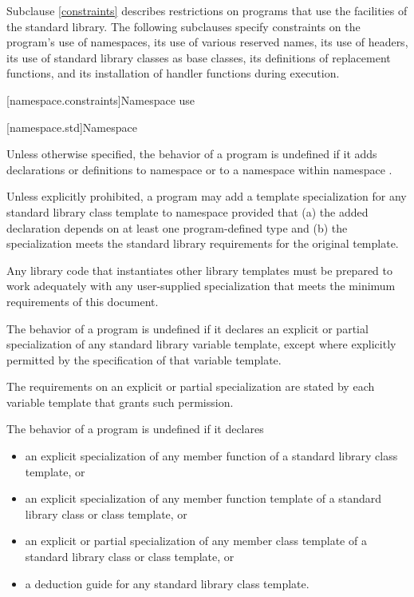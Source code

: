 \pnum
Subclause \ref{constraints} describes restrictions on \Cpp{} programs that use the facilities of
the \Cpp{} standard library. The following subclauses specify constraints on the
program's use of namespaces, its use of various reserved
names, its use of headers, its use of
standard library classes as base classes, its
definitions of replacement functions, and its
installation of handler functions during execution.

[namespace.constraints]{Namespace use}

[namespace.std]{Namespace }

\pnum
Unless otherwise specified,
the behavior of a \Cpp{} program is undefined if it adds declarations or definitions to namespace
or to a namespace within namespace
.

\pnum
Unless explicitly prohibited,
a program may add a template specialization for
any standard library class template
to namespace
 provided that
(a) the added declaration
depends on at least one program-defined type
and
(b) the specialization meets the standard library requirements
for the original template.
\begin{footnote}
Any
library code that instantiates other library templates
must be prepared to work adequately with any user-supplied specialization
that meets the minimum requirements of this document.
\end{footnote}

\pnum
The behavior of a \Cpp{} program is undefined
if it declares an explicit or partial specialization
of any standard library variable template,
except where explicitly permitted by the specification of that variable template.
\begin{note}
The requirements on an explicit or partial specialization
are stated by each variable template that grants such permission.
\end{note}

\pnum
The behavior of a \Cpp{} program is undefined if it declares
\begin{itemize}
\item an explicit specialization of any member function of a standard
library class template, or

\item an explicit specialization of any member function template of a
standard library class or class template, or

\item an explicit or partial specialization of any member class template
of a standard library class or class template, or

\item a deduction guide for any standard library class template.
\end{itemize}

